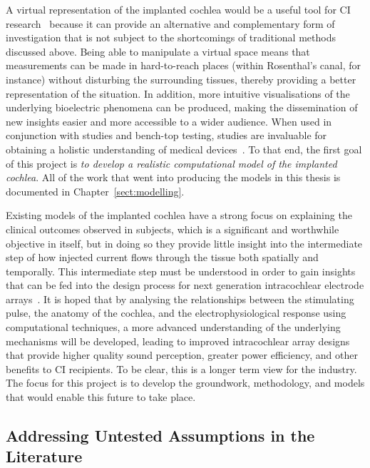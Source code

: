 A virtual representation of the implanted cochlea would be a useful tool for CI
research~\cite{girzon1987,micco2006,hanekom2015ciap} because it can provide an
alternative and complementary form of investigation that is not subject to the
shortcomings of traditional methods discussed above. Being able to manipulate a
virtual space means that measurements can be made in hard-to-reach places
(within Rosenthal's canal, for instance) without disturbing the surrounding
tissues, thereby providing a better representation of the \invivo{} situation.
In addition, more intuitive visualisations of the underlying bioelectric
phenomena can be produced, making the dissemination of new insights easier and
more accessible to a wider audience. When used in conjunction with \invivo{}
studies and bench-top testing, \insilico{} studies are invaluable for obtaining
a holistic understanding of medical
devices~\cite{kral1998,schimpf1998,fda2012,saba2012}.
To that end, the first goal of this project is \emph{to develop a realistic
computational model of the implanted cochlea}. All of the work that went into
producing the models in this thesis is documented in
Chapter~\ref{sect:modelling}.

Existing models of the implanted cochlea have a strong focus on explaining the
clinical outcomes observed in subjects, which is a significant and worthwhile
objective in itself, but in doing so they provide little insight into the
intermediate step of how injected current flows through the tissue both
spatially and temporally. This intermediate step must be understood in order to
gain insights that can be fed into the design process for next generation
intracochlear electrode arrays~\cite{girzon1987, schimpf1998}. It is hoped that
by analysing the relationships between the stimulating pulse, the anatomy of the
cochlea, and the electrophysiological response using computational techniques, a
more advanced understanding of the underlying mechanisms will be developed,
leading to improved intracochlear array designs that provide higher quality
sound perception, greater power efficiency, and other benefits to CI recipients.
To be clear, this is a longer term view for the industry. The focus for this
project is to develop the groundwork, methodology, and models that would enable
this future to take place.

\subsection{Addressing Untested Assumptions in the Literature}

